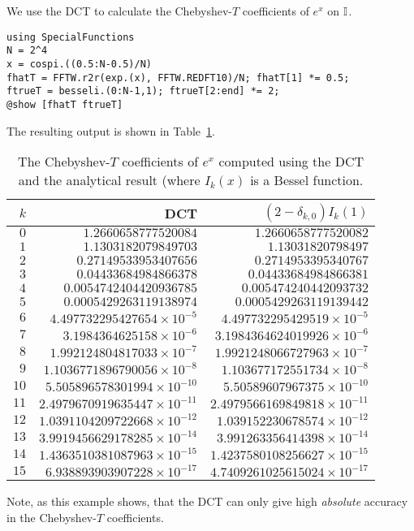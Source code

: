 \begin{example}\label{Example:DCT}
We use the DCT to calculate the Chebyshev-$T$ coefficients of $e^x$ on $\mathbb{I}$.
\begin{verbatim}
using SpecialFunctions
N = 2^4
x = cospi.((0.5:N-0.5)/N)
fhatT = FFTW.r2r(exp.(x), FFTW.REDFT10)/N; fhatT[1] *= 0.5;
ftrueT = besseli.(0:N-1,1); ftrueT[2:end] *= 2;
@show [fhatT ftrueT]
\end{verbatim}
The resulting output is shown in Table~\ref{table:ChebyshevTExponential}.
\begin{table}[htdp]
\caption{The Chebyshev-$T$ coefficients of $e^x$ computed using the DCT and the analytical result (where $I_k(x)$ is a Bessel function.}
\begin{center}
\begin{tabular}{rrr}
\hline
$k$ & DCT & $(2-\delta_{k,0})I_k(1)$\\
\hline
$0$ & $1.2660658777520084$ & $1.2660658777520082$\\
$1$ & $1.1303182079849703$ & $1.13031820798497$\\
$2$ & $0.27149533953407656$ & $0.2714953395340767$\\
$3$ & $0.04433684984866378$ & $0.04433684984866381$\\
$4$ & $0.0054742404420936785$ & $0.005474240442093732$\\
$5$ & $0.0005429263119138974$ & $0.0005429263119139442$\\
$6$ & $4.497732295427654\times10^{-5}$ & $4.497732295429519\times10^{-5}$\\
$7$ & $3.1984364625158\times10^{-6}$ & $3.1984364624019926\times10^{-6}$\\
$8$ & $1.992124804817033\times10^{-7}$ & $1.9921248066727963\times10^{-7}$\\
$9$ & $1.1036771896790056\times10^{-8}$ & $1.103677172551734\times10^{-8}$\\
$10$ & $5.505896578301994\times10^{-10}$ & $5.50589607967375\times10^{-10}$\\
$11$ & $2.4979670919635447\times10^{-11}$ & $2.4979566169849818\times10^{-11}$\\
$12$ & $1.0391104209722668\times10^{-12}$ & $1.039152230678574\times10^{-12}$\\
$13$ & $3.9919456629178285\times10^{-14}$ & $3.991263356414398\times10^{-14}$\\
$14$ & $1.4363510381087963\times10^{-15}$ & $1.4237580108256627\times10^{-15}$\\
$15$ & $6.938893903907228\times10^{-17}$ & $4.7409261025615024\times10^{-17}$\\
\hline
\end{tabular}
\end{center}
\label{table:ChebyshevTExponential}
\end{table}%
Note, as this example shows, that the DCT can only give high {\em absolute} accuracy in the Chebyshev-$T$ coefficients.
\end{example}

